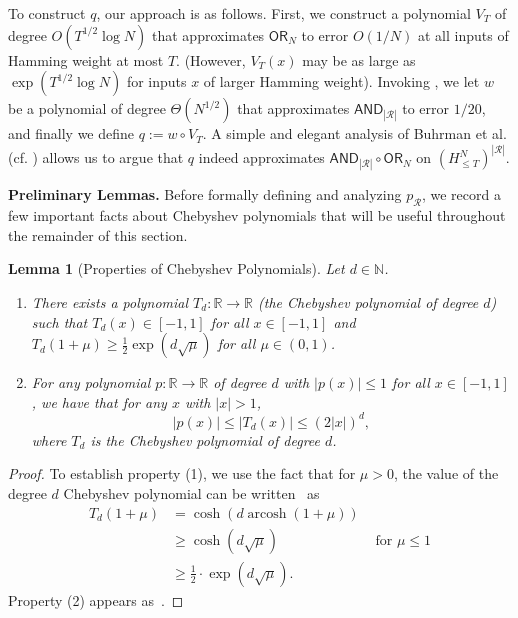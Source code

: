 \documentclass[11pt, letterpaper, fleqn]{article}
\newtheorem{lemma}[theorem]{Lemma}
\theoremstyle{plain}
\newcommand{\R}{\mathbb{R}}
\newcommand{\OR}{\mathsf{ OR}}
\newcommand{\Rcal}{\mathcal{R}}
\newcommand{\AND}{\mathsf{AND}}
\begin{document}
To construct $q$, our approach is as follows. First, we 
construct a polynomial $V_T$ of degree $O(T^{1/2} \log N)$ that approximates $\OR_N$ to error $O(1/N)$ at all inputs of Hamming weight at most $T$.
(However, $V_T(x)$ may be as large as $\exp(T^{1/2} \log N)$ for inputs $x$ of larger Hamming weight). 
Invoking , we let $w$ be a polynomial of degree $\Theta(N^{1/2})$ that approximates $\AND_{|\Rcal|}$ to error $1/20$,
and finally we define $q := w \circ V_T$. 
A simple and elegant analysis of Buhrman et al. \cite{BuhrmanNRW07} (cf. ) allows
us to argue that $q$ indeed approximates $\AND_{|\Rcal|} \circ \OR_{N}$
on $\left(H^N_{\le T}\right)^{|\mathcal{R}|}$.


\medskip \noindent \textbf{Preliminary Lemmas.}
Before formally defining and analyzing $p_{\mathcal{R}}$, we record a few important facts about Chebyshev polynomials that will be useful throughout the remainder of this section.

\begin{lemma}[Properties of Chebyshev Polynomials]\label{lem:cheb}
Let $d \in \mathbb{N}$.
\begin{enumerate}[(1)]
\item There exists a polynomial $T_d : \R \to \R$ (the Chebyshev polynomial of degree $d$) such that $T_d(x) \in [-1, 1]$ for all $x \in [-1, 1]$ and $T_d(1 + \mu) \ge \frac{1}{2} \exp(d\sqrt{\mu})$ for all $\mu \in (0, 1)$.
\item For any polynomial $p : \R \to \R$ of degree $d$ with $|p(x)| \le 1$ for all $x \in [-1, 1]$, we have that for any $x$ with $|x| > 1$,
\begin{equation}
    |p(x)| \leq |T_d(x)| \leq (2|x|)^d, \label{eq:swell}
\end{equation}
where $T_d$ is the Chebyshev polynomial of degree $d$.
\end{enumerate}
\end{lemma}

\begin{proof}
To establish property (1), we use the fact that for $\mu > 0$, the value of the degree $d$ Chebyshev polynomial can be written~\cite[\S 3.2 Problem 8(f)]{cheney} 
 as
\begin{align*}
T_d(1 + \mu) &= \cosh ( d \operatorname{arcosh} ( 1 + \mu) ) \\
& \ge \cosh ( d \sqrt{\mu} ) & \text{ for } \mu \le 1\\
& \ge \frac{1}{2} \cdot \exp(d \sqrt{\mu}).
\end{align*}
Property (2) appears as~\cite[3.2 Problem 19]{cheney}.
\end{proof}
\end{document}
